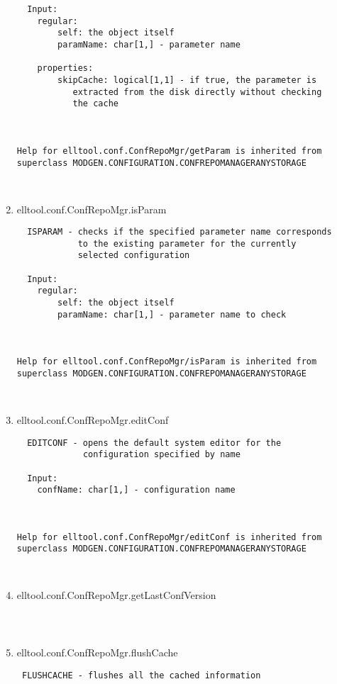 \begin{enumerate}
\begin{lstlisting}
  Input:
    regular:
        self: the object itself
        paramName: char[1,] - parameter name

    properties:
        skipCache: logical[1,1] - if true, the parameter is
           extracted from the disk directly without checking
           the cache



Help for elltool.conf.ConfRepoMgr/getParam is inherited from superclass MODGEN.CONFIGURATION.CONFREPOMANAGERANYSTORAGE



\end{lstlisting}
\fontfamily{\familydefault}
\selectfont
\item {elltool.conf.ConfRepoMgr.isParam}
\selectfont
\begin{lstlisting}
  ISPARAM - checks if the specified parameter name corresponds
            to the existing parameter for the currently
            selected configuration

  Input:
    regular:
        self: the object itself
        paramName: char[1,] - parameter name to check



Help for elltool.conf.ConfRepoMgr/isParam is inherited from superclass MODGEN.CONFIGURATION.CONFREPOMANAGERANYSTORAGE



\end{lstlisting}
\fontfamily{\familydefault}
\selectfont
\item {elltool.conf.ConfRepoMgr.editConf}
\selectfont
\begin{lstlisting}
  EDITCONF - opens the default system editor for the
             configuration specified by name

  Input:
    confName: char[1,] - configuration name



Help for elltool.conf.ConfRepoMgr/editConf is inherited from superclass MODGEN.CONFIGURATION.CONFREPOMANAGERANYSTORAGE



\end{lstlisting}
\fontfamily{\familydefault}
\selectfont
\item {elltool.conf.ConfRepoMgr.getLastConfVersion}
\selectfont
\begin{lstlisting}



\end{lstlisting}
\fontfamily{\familydefault}
\selectfont
\item {elltool.conf.ConfRepoMgr.flushCache}
\selectfont
\begin{lstlisting}
 FLUSHCACHE - flushes all the cached information


\end{lstlisting}
\end{enumerate}
